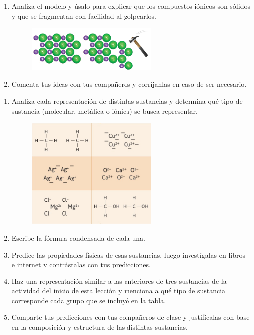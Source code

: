 \documentclass[11pt]{book}
\begin{document}
\begin{boxK}
  \begin{enumerate}
    \item  Analiza el modelo y úsalo para explicar que los compuestos iónicos son sólidos y que se fragmentan con facilidad al golpearlos.
          \begin{figure}[H]
            \centering
            \includegraphics[width=0.6\textwidth]{ionicos3.png}
            \label{fig:ionicos3}
          \end{figure}
    \item Comenta tus ideas con tus compañeros y corríjanlas en caso de ser necesario.
  \end{enumerate}
\end{boxK}



\begin{boxK}
  \begin{enumerate}
    \item Analiza cada representación de distintas sustancias y determina qué tipo de sustancia (molecular, metálica o iónica) se busca representar.
          \begin{figure}[H]
            \centering
            \includegraphics[width=0.6\textwidth]{formulas_condensadas.jpg}
          \end{figure}
    \item Escribe la fórmula condensada de cada una.
    \item Predice las propiedades físicas de esas sustancias, luego investígalas en libros e internet y contrástalas con tus predicciones.
    \item Haz una representación similar a las anteriores de tres sustancias de la actividad del inicio de esta lección y menciona a qué tipo de sustancia corresponde cada grupo que se incluyó en la tabla.
    \item Comparte tus predicciones con tus compañeros de clase y justifícalas con base en la composición y estructura de las distintas sustancias.
  \end{enumerate}
\end{boxK}
\end{document}
